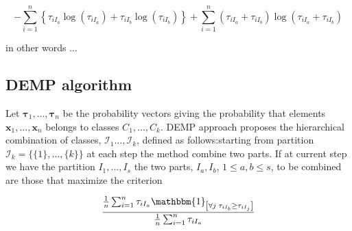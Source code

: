 \documentclass[10pt, a4paper]{article}
\begin{document}
\[
- \sum_{i=1}^n \left\{ \tau_{iI_a} \log(\tau_{iI_a}) + \tau_{iI_b} \log(\tau_{iI_b})\right\} +  \sum_{i=1}^n  (\tau_{iI_a}+\tau_{iI_b}) \log(\tau_{iI_a} + \tau_{iI_b})
\]

in other words $\dots$

\subsection*{DEMP algorithm}

Let ${\boldsymbol\tau}_1, \dots, {\boldsymbol\tau}_n$ be the probability vectors giving the probability that elements $\textbf{x}_1, \dots, \textbf{x}_n$ belongs to classes $C_1, \dots, C_k$. DEMP approach \citep{hennig2010methods} proposes the hierarchical combination of classes,  $\mathcal{I}_1 \dots, \mathcal{I}_k$, defined as follows:starting from partition $\mathcal{I}_k = \{\{1\},\dots, \{k\}\}$ at each step the method combine two parts. If at current step we have the partition  $I_1, \dots, I_s$ the two parts, $I_a, I_b$, $1 \leq a,b \leq s$,  to be combined are those that maximize the criterion

\[
\frac{ \frac{1}{n} \sum_{i=1}^n {\tau_{iI_a} \mathbbm{1}_{\left[ \forall j\; \tau_{i I_{b}} \geq \tau_{iI_j} \right]}}}{ \frac{1}{n} \sum_{i=1}^n \tau_{iI_a}}
\]



{}
\end{document}
